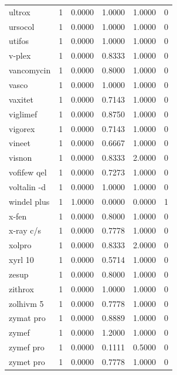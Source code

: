 \begin{longtable}{p{3.0cm}rrrrr}
ultrox & 1 & 0.0000 & 1.0000 & 1.0000 & 0 \\
ursocol & 1 & 0.0000 & 1.0000 & 1.0000 & 0 \\
utifos & 1 & 0.0000 & 1.0000 & 1.0000 & 0 \\
v-plex & 1 & 0.0000 & 0.8333 & 1.0000 & 0 \\
vancomycin & 1 & 0.0000 & 0.8000 & 1.0000 & 0 \\
vasco & 1 & 0.0000 & 1.0000 & 1.0000 & 0 \\
vaxitet & 1 & 0.0000 & 0.7143 & 1.0000 & 0 \\
viglimef & 1 & 0.0000 & 0.8750 & 1.0000 & 0 \\
vigorex & 1 & 0.0000 & 0.7143 & 1.0000 & 0 \\
vineet & 1 & 0.0000 & 0.6667 & 1.0000 & 0 \\
visnon & 1 & 0.0000 & 0.8333 & 2.0000 & 0 \\
vofifew qel & 1 & 0.0000 & 0.7273 & 1.0000 & 0 \\
voltalin -d & 1 & 0.0000 & 1.0000 & 1.0000 & 0 \\
windel plus & 1 & 1.0000 & 0.0000 & 0.0000 & 1 \\
x-fen & 1 & 0.0000 & 0.8000 & 1.0000 & 0 \\
x-ray c/s & 1 & 0.0000 & 0.7778 & 1.0000 & 0 \\
xolpro & 1 & 0.0000 & 0.8333 & 2.0000 & 0 \\
xyrl 10 & 1 & 0.0000 & 0.5714 & 1.0000 & 0 \\
zesup & 1 & 0.0000 & 0.8000 & 1.0000 & 0 \\
zithrox & 1 & 0.0000 & 1.0000 & 1.0000 & 0 \\
zolhivm 5 & 1 & 0.0000 & 0.7778 & 1.0000 & 0 \\
zymat pro & 1 & 0.0000 & 0.8889 & 1.0000 & 0 \\
zymef & 1 & 0.0000 & 1.2000 & 1.0000 & 0 \\
zymef pro & 1 & 0.0000 & 0.1111 & 0.5000 & 0 \\
zymet pro & 1 & 0.0000 & 0.7778 & 1.0000 & 0 \\
\end{longtable}
\endgroup
